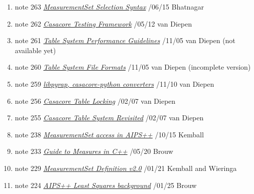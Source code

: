 %

\raggedright

\begin{enumerate}

\item
note 263
\href{263.html}{\textit{MeasurementSet Selection Syntax}}
/06/15 Bhatnagar

\item
note 262
\href{262.html}{\textit{Casacore Testing Framework}}
/05/12 van Diepen

\item
note 261
\href{261.html}{\textit{Table System Performance Guidelines}}
/11/05 van Diepen (not available yet)

\item
note 260
\href{260.html}{\textit{Table System File Formats}}
/11/05 van Diepen (incomplete version)

\item
note 259
\href{259.html}{\textit{libpyrap, casacore-python converters}}
/11/10 van Diepen

\item
note 256
\href{256.html}{\textit{Casacore Table Locking}}
/02/07 van Diepen

\item
note 255
\href{255.html}{\textit{Casacore Table System Revisited}}
/02/07 van Diepen

\item
note 238
\href{238.html}{\textit{MeasurementSet access in AIPS++}}
/10/15 Kemball

\item
note 233
\href{233.html}{\textit{Guide to Measures in C++}}
/05/20 Brouw

\item
note 229
\href{229.html}{\textit{MeasurementSet Definition v2.0}}
/01/21 Kemball and Wieringa

\item
note 224
\href{224.html}{\textit{AIPS++ Least Squares background}}
/01/25 Brouw


\end{enumerate}
